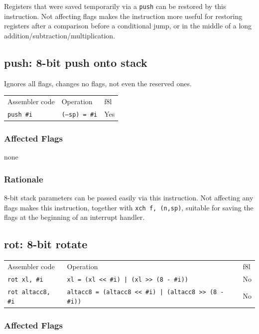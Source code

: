 \documentclass{book}
\begin{document}
Registers that were saved temporarily via a \texttt{push} can be restored by this instruction. Not affecting flags makes the instruction more useful for restoring registers after a comparison before a conditional jump, or in the middle of a long addition\slash subtraction\slash multiplication.


\subsection{push: 8-bit push onto stack}

Ignores all flags, changes no flags, not even the reserved ones.

\begin{tabular}{l l l}
Assembler code    & Operation             & f8l \\
\texttt{push \#i} & \texttt{(--sp) = \#i} & Yes
\end{tabular}

\subsubsection*{Affected Flags}

none

\subsubsection*{Rationale}

8-bit stack parameters can be passed easily via this instruction. Not affecting any flags makes this instruction, together with \texttt{xch f, (n,sp)}, suitable for saving the flags at the beginning of an interrupt handler.

\subsection{rot: 8-bit rotate}

\begin{tabular}{l l l}
Assembler code            & Operation                                                    & f8l \\
\texttt{rot xl, \#i}      & \texttt{xl = (xl << \#i) | (xl >> (8 - \#i))}                & No \\
\texttt{rot altacc8, \#i} & \texttt{altacc8 = (altacc8 << \#i) | (altacc8 >> (8 - \#i))} & No \\
\end{tabular}

\subsubsection*{Affected Flags}
\end{document}
